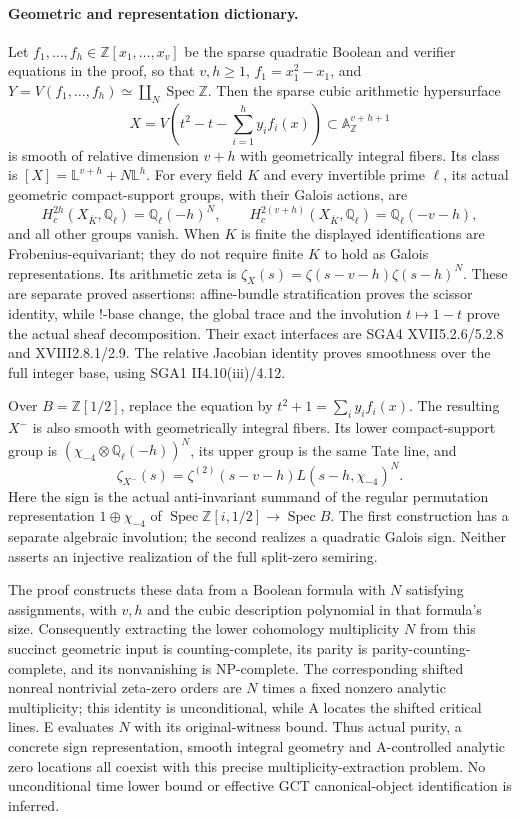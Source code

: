 \paragraph{Geometric and representation dictionary.}
Let $f_1,\ldots,f_h\in\mathbb Z[x_1,\ldots,x_v]$ be the sparse quadratic Boolean and verifier equations in the proof, so that $v,h\geq1$, $f_1=x_1^2-x_1$, and $Y=V(f_1,\ldots,f_h)\simeq\coprod_N\operatorname{Spec}\mathbb Z$. Then the sparse cubic arithmetic hypersurface
\[
 X=V\left(t^2-t-\sum_{i=1}^h y_i f_i(x)\right)
             \subset\mathbb A^{v+h+1}_\mathbb Z
\]
is smooth of relative dimension $v+h$ with geometrically integral fibers. Its class is $[X]=\mathbb L^{v+h}+N\mathbb L^h$. For every field $K$ and every invertible prime $\ell$, its actual geometric compact-support groups, with their Galois actions, are
\[
 H_c^{2h}(X_{\overline K},\mathbb Q_\ell)=\mathbb Q_\ell(-h)^N,
 \qquad
 H_c^{2(v+h)}(X_{\overline K},\mathbb Q_\ell)=\mathbb Q_\ell(-v-h),
\]
and all other groups vanish. When $K$ is finite the displayed identifications are Frobenius-equivariant; they do not require finite $K$ to hold as Galois representations. Its arithmetic zeta is
$\zeta_X(s)=\zeta(s-v-h)\zeta(s-h)^N$.
These are separate proved assertions: affine-bundle stratification proves the scissor identity, while !-base change, the global trace and the involution $t\mapsto1-t$ prove the actual sheaf decomposition. Their exact interfaces are SGA4 XVII5.2.6/5.2.8 and XVIII2.8.1/2.9. The relative Jacobian identity proves smoothness over the full integer base, using SGA1 II4.10(iii)/4.12.

Over $B=\mathbb Z[1/2]$, replace the equation by $t^2+1=\sum_i y_i f_i(x)$. The resulting $X^-$ is also smooth with geometrically integral fibers. Its lower compact-support group is $(\chi_{-4}\otimes\mathbb Q_\ell(-h))^N$, its upper group is the same Tate line, and
\[
 \zeta_{X^-}(s)=\zeta^{(2)}(s-v-h)L(s-h,\chi_{-4})^N.
\]
Here the sign is the actual anti-invariant summand of the regular permutation representation $1\oplus\chi_{-4}$ of $\operatorname{Spec}\mathbb Z[i,1/2]\to\operatorname{Spec}B$. The first construction has a separate algebraic involution; the second realizes a quadratic Galois sign. Neither asserts an injective realization of the full split-zero semiring.

The proof constructs these data from a Boolean formula with $N$ satisfying assignments, with $v,h$ and the cubic description polynomial in that formula's size. Consequently extracting the lower cohomology multiplicity $N$ from this succinct geometric input is counting-complete, its parity is parity-counting-complete, and its nonvanishing is NP-complete. The corresponding shifted nonreal nontrivial zeta-zero orders are $N$ times a fixed nonzero analytic multiplicity; this identity is unconditional, while A locates the shifted critical lines. E evaluates $N$ with its original-witness bound. Thus actual purity, a concrete sign representation, smooth integral geometry and A-controlled analytic zero locations all coexist with this precise multiplicity-extraction problem. No unconditional time lower bound or effective GCT canonical-object identification is inferred.




